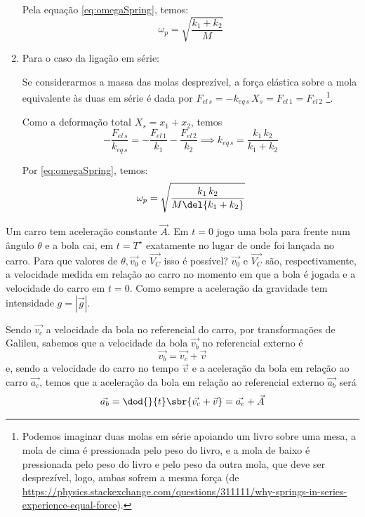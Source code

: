 \documentclass[]{IMTexam}
\begin{document}
\begin{questions}
\begin{solution}
\begin{enumerate}[label=(\alph*)]
			      Pela equação \ref{eq:omegaSpring}, temos:
			      \begin{equation}\label{eq:freqPara}
				      \omega_{p}=\sqrt{\dfrac{k_1+k_2}{M}}
			      \end{equation}

			\item Para o caso da ligação em série:

			      Se considerarmos a massa das molas desprezível, a força elástica sobre a mola equivalente às duas em série é dada por $ F_{el\,s}=-k_{eq\,s}\,X_s=F_{el\,1}=F_{el\,2} $%
			      \footnote{Podemos imaginar duas molas em série apoiando um livro sobre uma mesa, a mola de cima é pressionada pelo peso do livro, e a mola de baixo é pressionada pelo peso do livro e pelo peso da outra mola, que deve ser desprezível, logo, ambas sofrem a mesma força (de \url{https://physics.stackexchange.com/questions/311111/why-springs-in-series-experience-equal-force}).}.

			      Como a deformação total $ X_s=x_1+x_2 $, temos
			      \[ -\dfrac{F_{el\,s}}{k_{eq\,s}}=-\dfrac{F_{el\,1}}{k_1}-\dfrac{F_{el\,2}}{k_2}\implies k_{eq\,s}=\dfrac{k_1\,k_2}{k_1+k_2} \]

			      Por \ref{eq:omegaSpring}, temos:
			      \begin{equation}\label{eq:freqPerp}
				      \omega_{p}=\sqrt{\dfrac{k_1\,k_2}{M\del{k_1+k_2}}}
			      \end{equation}
		\end{enumerate}
	\end{solution}

	\question Um carro tem aceleração constante $\vec{A}$. Em $ t = 0 $ jogo uma bola para frente num ângulo $\theta$ e a bola cai, em $ t = T^{\star} $ exatamente no lugar de onde foi lançada no carro. Para que valores de $ \theta, \vec{v_0} $ e $\vec{V_C}$ isso é possível? $\vec{v_0}$ e $\vec{V_C}$ são, respectivamente, a velocidade medida em relação ao carro no momento em que a bola é jogada e a velocidade do carro em
	$ t = 0 $. Como sempre a aceleração da gravidade tem intensidade $ g = |\vec{g}| $.

	\begin{solution}

		\begin{multi}
			Sendo $\vec{v_c}$ a velocidade da bola no referencial do carro, por transformações de Galileu, sabemos que a velocidade da bola $ \vec{v_b} $ no referencial externo é
			\[ \vec{v_b}=\vec{v_c}+\vec{v} \]
			e, sendo a velocidade do carro no tempo $ \vec{v} $ e a aceleração da bola em relação ao carro $ \vec{a_c} $, temos que a aceleração da bola em relação ao referencial externo $ \vec{a_b} $ será
			\[ \vec{a_b}=\dod{}{t}\sbr{\vec{v_c}+\vec{v}}=\vec{a_c}+\vec{A} \]


\end{multi}
\end{solution}
\end{questions}
\end{document}
